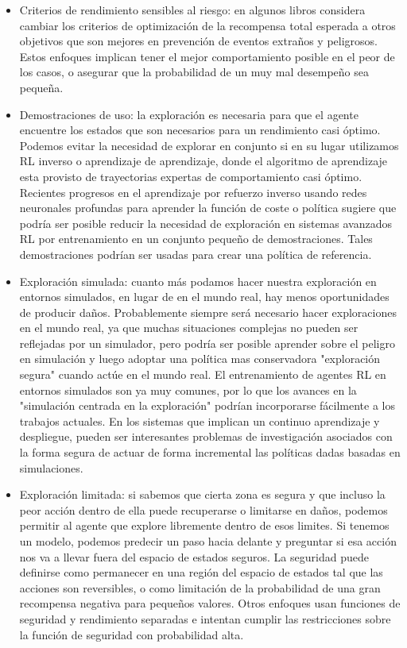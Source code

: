 \documentclass[12pt,a4paper]{article}
\begin{document}
\begin{itemize}
\item Criterios de rendimiento sensibles al riesgo: en algunos libros considera cambiar los criterios de optimización de la recompensa total esperada a otros objetivos que son mejores en prevención de eventos extraños y peligrosos. Estos enfoques implican tener el mejor comportamiento posible en el peor de los casos, o asegurar que la probabilidad de un muy mal desempeño sea pequeña.

\item Demostraciones de uso: la exploración es necesaria para que el agente encuentre los estados que son necesarios para un rendimiento casi óptimo. Podemos evitar la necesidad de explorar en conjunto si en su lugar utilizamos RL inverso o aprendizaje de aprendizaje, donde el algoritmo de aprendizaje esta provisto de trayectorias expertas de comportamiento casi óptimo. Recientes progresos en el aprendizaje por refuerzo inverso usando redes neuronales profundas para aprender la función de coste o política sugiere que podría ser posible reducir la necesidad de exploración en sistemas avanzados RL por entrenamiento en un conjunto pequeño de demostraciones. Tales demostraciones podrían ser usadas para crear una política de referencia.

\item Exploración simulada: cuanto más podamos hacer nuestra exploración en entornos simulados, en lugar de en el mundo real, hay menos oportunidades de producir daños. Probablemente siempre será necesario hacer exploraciones en el mundo real, ya que muchas situaciones complejas no pueden ser reflejadas por un simulador, pero podría ser posible aprender sobre el peligro en simulación y luego adoptar una política mas conservadora "exploración segura" cuando actúe en el mundo real. El entrenamiento de agentes RL en entornos simulados son ya muy comunes, por lo que los avances en la "simulación centrada en la exploración" podrían incorporarse fácilmente a los trabajos actuales. En los sistemas que implican un continuo aprendizaje y despliegue, pueden ser interesantes problemas de investigación asociados con la forma segura de actuar de forma incremental las políticas dadas  basadas en simulaciones.

\item Exploración limitada: si sabemos que cierta zona es segura y que incluso la peor acción dentro de ella puede recuperarse o limitarse en daños, podemos permitir al agente que explore libremente dentro de esos limites. Si tenemos un modelo, podemos predecir un paso hacia delante y preguntar si esa acción nos va a llevar fuera del espacio de estados seguros. La seguridad puede definirse como permanecer en una región  del espacio de estados tal que las acciones son reversibles, o como limitación de la probabilidad de una gran recompensa negativa para pequeños valores. Otros enfoques usan funciones de seguridad y rendimiento separadas e intentan cumplir las restricciones sobre la función de seguridad con probabilidad alta.


\end{itemize}
\end{document}
